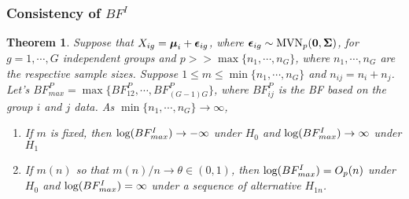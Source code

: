\documentclass[12pt]{article}
\theoremstyle{plain}%
\newtheorem{theorem}{Theorem}
\theoremstyle{definition}
\def\bzero{{\mathbf 0}}
\def\log{\hbox{log}}
\def\MVN{\hbox{MVN}}
\def\log{\hbox{log}}
\def\bzero{{\mathbf 0}}
\newcommand{\uepsilon}          {\mbox{\boldmath$\epsilon$}}
\newcommand{\umu}               {\mbox{\boldmath$\mu$}}
\newcommand{\uSigma}            {\mbox{\boldmath$\Sigma$}}
\begin{document}
\subsubsection{Consistency of $BF^{I}$}
\begin{theorem}
Suppose that $X_{ig} = \umu_i + \uepsilon_{ig}$, where $\uepsilon_{ig} \sim \MVN_{p}(\bzero, \uSigma)$, for $g = 1, \cdots, G$ independent groups and $p >> \max\{n_1, \cdots, n_{G}\}$, where $n_1, \cdots, n_{G}$ are the respective sample sizes. Suppose $1 \leq m  \leq \min\{n_1, \cdots, n_{G}\}$ and $n_{ij} = n_i + n_j$. Let's $BF^{P}_{max} = \max\{BF^{P}_{12}, \cdots, BF^{P}_{(G-1)G}\}$, where $BF^{P}_{ij}$ is the BF based on the group $i$ and $j$ data. As $\min\{n_1, \cdots, n_{G}\} \rightarrow \infty$,
\begin{enumerate}
    \item If $m$ is fixed, then $\log(BF^{I}_{max}) \rightarrow -\infty$ under $H_0$ and $\log(BF^{I}_{max}) \rightarrow \infty$ under $H_1$ 
    \item If $m(n)$ so that $m(n)/n \rightarrow \theta \in (0, 1)$, then $\log(BF^{I}_{max}) =O_p(n)$ under $H_0$ and $\log(BF^{I}_{max}) = \infty$ under a sequence of alternative $H_{1n}$.
\end{enumerate}
\end{theorem}
\end{document}
